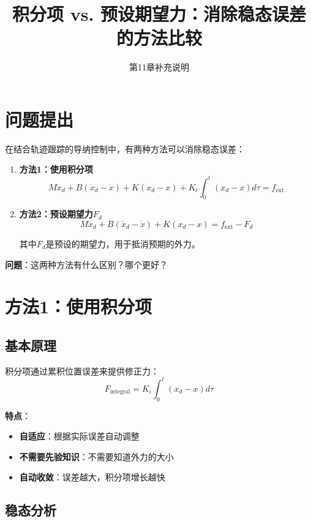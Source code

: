 \documentclass[12pt,a4paper]{article}
\title{积分项 vs. 预设期望力：消除稳态误差的方法比较}
\author{第11章补充说明}
\date{}
\begin{document}
\maketitle

\section{问题提出}

在结合轨迹跟踪的导纳控制中，有两种方法可以消除稳态误差：

\begin{enumerate}
\item \textbf{方法1：使用积分项}
\begin{equation}
M\ddot{x}_d + B(\dot{x}_d - \dot{x}) + K(x_d - x) + K_i \int_0^t (x_d - x) d\tau = f_{\text{ext}}
\end{equation}

\item \textbf{方法2：预设期望力$F_d$}
\begin{equation}
M\ddot{x}_d + B(\dot{x}_d - \dot{x}) + K(x_d - x) = f_{\text{ext}} - F_d
\end{equation}

其中$F_d$是预设的期望力，用于抵消预期的外力。
\end{enumerate}

\textbf{问题}：这两种方法有什么区别？哪个更好？

\section{方法1：使用积分项}

\subsection{基本原理}

积分项通过累积位置误差来提供修正力：
\begin{equation}
F_{\text{integral}} = K_i \int_0^t (x_d - x) d\tau
\end{equation}

\textbf{特点}：
\begin{itemize}
\item \textbf{自适应}：根据实际误差自动调整
\item \textbf{不需要先验知识}：不需要知道外力的大小
\item \textbf{自动收敛}：误差越大，积分项增长越快
\end{itemize}

\subsection{稳态分析}
\end{document}
